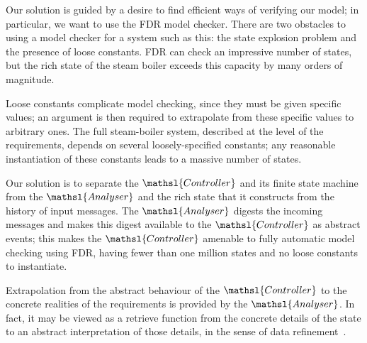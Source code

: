 \documentclass{report}
\begin{document}
Our solution is guided by a desire to find efficient ways of verifying
our model; in particular, we want to use the FDR model checker.  There
are two obstacles to using a model checker for a system such as this:
the state explosion problem and the presence of loose constants.  FDR
can check an impressive number of states, but the rich state of the
steam boiler exceeds this capacity by many orders of magnitude.

Loose constants complicate model checking, since they must be given
specific values; an argument is then required to extrapolate from
these specific values to arbitrary ones.  The full steam-boiler
system, described at the level of the requirements, depends on several
loosely-specified constants; any reasonable instantiation of these
constants leads to a massive number of states.

Our solution is to separate the \( \mathsl{Controller} \) and its
finite state machine from the \( \mathsl{Analyser}\) and the rich
state that it constructs from the history of input messages.  The \(
\mathsl{Analyser} \)\/ digests the incoming messages and makes this
digest available to the \( \mathsl{Controller} \)\/ as abstract
events; this makes the \( \mathsl{Controller} \)\/ amenable to fully
automatic model checking using FDR, having fewer than one million
states and no loose constants to instantiate.

Extrapolation from the abstract behaviour of the \(
\mathsl{Controller} \) to the concrete realities of the requirements
is provided by the \( \mathsl{Analyser} \).  In fact, it may be viewed
as a retrieve function from the concrete details of the state to an
abstract interpretation of those details, in the sense of data
refinement~\cite{jones-90, woodcock-davies-96}.
\end{document}
